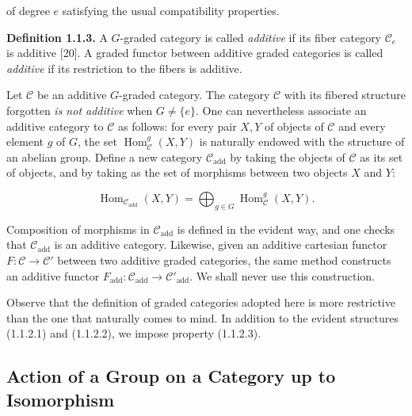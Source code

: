 %
of degree $e$ satisfying the usual compatibility properties.

\noindent\textbf{Definition 1.1.3.}\quad
A $G$-graded category is called \emph{additive} if its fiber category
$\mathcal C_e$ is additive [20].
A graded functor between additive graded categories is called
\emph{additive} if its restriction to the fibers is additive.

Let $\mathcal C$ be an additive $G$-graded category. The category
$\mathcal C$ with its fibered structure forgotten \emph{is not additive}
when $G\neq\{e\}$. One can nevertheless associate an additive category to
$\mathcal C$ as follows: for every pair $X,Y$ of objects of $\mathcal C$
and every element $g$ of $G$, the set
$\operatorname{Hom}_{\mathcal C}^{g}(X,Y)$ is naturally endowed with the
structure of an abelian group. Define a new category
$\mathcal C_{\mathrm{add}}$ by taking the objects of $\mathcal C$ as its
set of objects, and by taking as the set of morphisms between two objects
$X$ and $Y$:

\begingroup
\makeatletter
\tagsleft@true
\let\veqno\@@leqno
\makeatother
\begin{equation}
  \operatorname{Hom}_{\mathcal C_{\mathrm{add}}}(X,Y)
  =\bigoplus_{g\in G}\operatorname{Hom}_{\mathcal C}^{g}(X,Y).
  \tag{1.1.3.1}
\end{equation}
\endgroup

Composition of morphisms in $\mathcal C_{\mathrm{add}}$ is defined in the
evident way, and one checks that $\mathcal C_{\mathrm{add}}$ is an
additive category.
Likewise, given an additive cartesian functor
$F\colon\mathcal C\to\mathcal C'$ between two additive graded categories,
the same method constructs an additive functor
$F_{\mathrm{add}}\colon\mathcal C_{\mathrm{add}}\to
\mathcal C'_{\mathrm{add}}$. We shall never use this construction.

Observe that the definition of graded categories adopted here is more
restrictive than the one that naturally comes to mind. In addition to the
evident structures (1.1.2.1) and (1.1.2.2), we impose property (1.1.2.3).

\subsection{Action of a Group on a Category up to Isomorphism}

